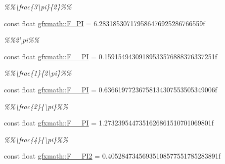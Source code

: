 \begin{DoxyCompactItemize}
\begin{DoxyCompactList}\small\item\em \%\%\textbackslash{}frac\{3\textbackslash{}pi\}\{2\}\%\% \end{DoxyCompactList}\item 
\hypertarget{group___scalar_math_consts_gac6cbd226e329cad09f1bab1504203fec}{}const float \hyperlink{group___scalar_math_consts_gac6cbd226e329cad09f1bab1504203fec}{gfxmath\+::\+F\+\_\+P\+I} = 6.\+283185307179586476925286766559f\label{group___scalar_math_consts_gac6cbd226e329cad09f1bab1504203fec}

\begin{DoxyCompactList}\small\item\em \%\%2\textbackslash{}pi\%\% \end{DoxyCompactList}\item 
\hypertarget{group___scalar_math_consts_ga325608134effda0b7b34f7088c419db0}{}const float \hyperlink{group___scalar_math_consts_ga325608134effda0b7b34f7088c419db0}{gfxmath\+::\+F\+\_\+\_\+P\+I} = 0.\+15915494309189533576888376337251f\label{group___scalar_math_consts_ga325608134effda0b7b34f7088c419db0}

\begin{DoxyCompactList}\small\item\em \%\%\textbackslash{}frac\{1\}\{2\textbackslash{}pi\}\%\% \end{DoxyCompactList}\item 
\hypertarget{group___scalar_math_consts_ga7d7b856fb17ca616495a547e582ca817}{}const float \hyperlink{group___scalar_math_consts_ga7d7b856fb17ca616495a547e582ca817}{gfxmath\+::\+F\+\_\+\_\+\+P\+I} = 0.\+63661977236758134307553505349006f\label{group___scalar_math_consts_ga7d7b856fb17ca616495a547e582ca817}

\begin{DoxyCompactList}\small\item\em \%\%\textbackslash{}frac\{2\}\{\textbackslash{}pi\}\%\% \end{DoxyCompactList}\item 
\hypertarget{group___scalar_math_consts_ga3cd60bb81423c63766d16736f113da50}{}const float \hyperlink{group___scalar_math_consts_ga3cd60bb81423c63766d16736f113da50}{gfxmath\+::\+F\+\_\+\_\+\+P\+I} = 1.\+2732395447351626861510701069801f\label{group___scalar_math_consts_ga3cd60bb81423c63766d16736f113da50}

\begin{DoxyCompactList}\small\item\em \%\%\textbackslash{}frac\{4\}\{\textbackslash{}pi\}\%\% \end{DoxyCompactList}\item 
\hypertarget{group___scalar_math_consts_ga0eddee00e29a22722352a3d22728d807}{}const float \hyperlink{group___scalar_math_consts_ga0eddee00e29a22722352a3d22728d807}{gfxmath\+::\+F\+\_\+\_\+\+P\+I2} = 0.\+40528473456935108577551785283891f\label{group___scalar_math_consts_ga0eddee00e29a22722352a3d22728d807}


\end{DoxyCompactItemize}
